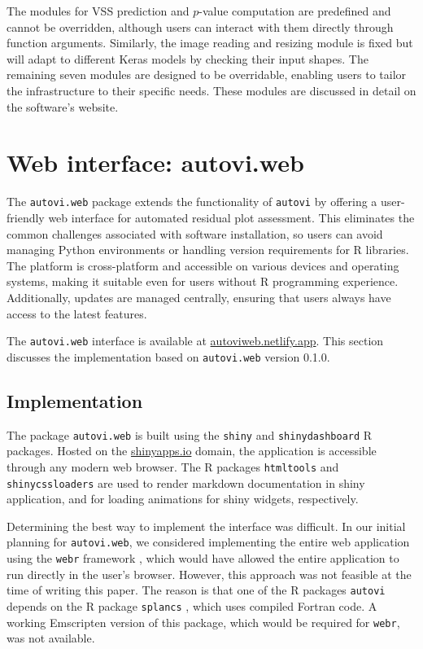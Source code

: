 \documentclass[
doublespace,
  times]{anzsauth}
\begin{document}
The modules for VSS prediction and \(p\)-value computation are
predefined and cannot be overridden, although users can interact with
them directly through function arguments. Similarly, the image reading
and resizing module is fixed but will adapt to different Keras models by
checking their input shapes. The remaining seven modules are designed to
be overridable, enabling users to tailor the infrastructure to their
specific needs. These modules are discussed in detail on the software's
website.

\section{Web interface: autovi.web}\label{sec-autovi-web}

The \texttt{autovi.web} package extends the functionality of
\texttt{autovi} by offering a user-friendly web interface for automated
residual plot assessment. This eliminates the common challenges
associated with software installation, so users can avoid managing
Python environments or handling version requirements for R libraries.
The platform is cross-platform and accessible on various devices and
operating systems, making it suitable even for users without R
programming experience. Additionally, updates are managed centrally,
ensuring that users always have access to the latest features.

The \texttt{autovi.web} interface is available at
\url{autoviweb.netlify.app}. This section discusses the implementation
based on \texttt{autovi.web} version 0.1.0.

\subsection{Implementation}\label{implementation}

The package \texttt{autovi.web} is built using the \texttt{shiny}
\citep{shiny} and \texttt{shinydashboard} \citep{shinydashboard} R
packages. Hosted on the \href{https://www.shinyapps.io}{shinyapps.io}
domain, the application is accessible through any modern web browser.
The R packages \texttt{htmltools} \citep{htmltools} and
\texttt{shinycssloaders} \citep{shinycssloaders} are used to render
markdown documentation in shiny application, and for loading animations
for shiny widgets, respectively.

Determining the best way to implement the interface was difficult. In
our initial planning for \texttt{autovi.web}, we considered implementing
the entire web application using the \texttt{webr} framework
\citep{webr}, which would have allowed the entire application to run
directly in the user's browser. However, this approach was not feasible
at the time of writing this paper. The reason is that one of the R
packages \texttt{autovi} depends on the R package \texttt{splancs}
\citep{splancs}, which uses compiled Fortran code. A working Emscripten
\citep{zakai2011emscripten} version of this package, which would be
required for \texttt{webr}, was not available.
\end{document}
